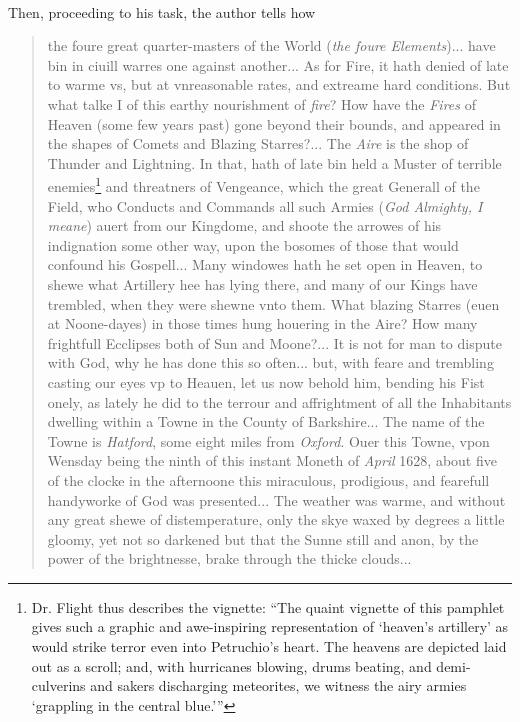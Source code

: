 \documentclass[a4paper, 12pt, oneside, polutonikogreek, english]{article}
\begin{document}
\paragraph{}
Then, proceeding to his task, the author tells how
\begin{quotation}
the foure great quarter-masters of the World (\emph{the foure Elements})... have bin in ciuill warres one against another... As for Fire, it hath denied of late to warme vs, but at vnreasonable rates, and extreame hard conditions. But what talke I of this earthy nourishment of \emph{fire}? How have the \emph{Fires} of Heaven (some few years past) gone beyond their bounds, and appeared in the shapes of Comets and Blazing Starres?... The \emph{Aire} is the shop of Thunder and Lightning. In that, hath of late bin held a Muster of terrible enemies\footnote{Dr. Flight thus describes the vignette: ``The quaint vignette of this pamphlet gives such a graphic and awe-inspiring representation of `heaven's artillery' as would strike terror even into Petruchio's heart. The heavens are depicted laid out as a scroll; and, with hurricanes blowing, drums beating, and demi-culverins and sakers discharging meteorites, we witness the airy armies `grappling in the central blue.'''} and threatners of Vengeance, which the great Generall of the Field, who Conducts and Commands all such Armies (\emph{God Almighty, I meane}) auert from our Kingdome, and shoote the arrowes of his indignation some other way, upon the bosomes of those that would confound his Gospell... Many windowes hath he set open in Heaven, to shewe what Artillery hee has lying there, and many of our Kings have trembled, when they were shewne vnto them. What blazing Starres (euen at Noone-dayes) in those times hung houering in the Aire? How many frightfull Ecclipses both of Sun and Moone?... It is not for man to dispute with God, why he has done this so often... but, with feare and trembling casting our eyes vp to Heauen, let us now behold him, bending his Fist onely, as lately he did to the terrour and affrightment of all the Inhabitants dwelling within a Towne in the County of Barkshire... The name of the Towne is \emph{Hatford}, some eight miles from \emph{Oxford}. Ouer this Towne, vpon Wensday being the ninth of this instant Moneth of \emph{April} 1628, about five of the clocke in the afternoone this miraculous, prodigious, and fearefull handyworke of God was presented... The weather was warme, and without any great shewe of distemperature, only the skye waxed by degrees a little gloomy, yet not so darkened but that the Sunne still and anon, by the power of the brightnesse, brake through the thicke clouds...


\end{quotation}
\end{document}
